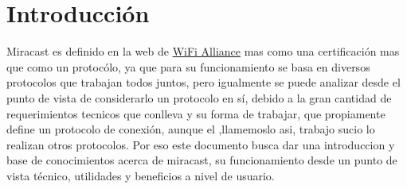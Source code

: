 \section{Introducción}

Miracast es definido en la web de \href{http://www.wi-fi.org/discover-wi-fi/wi-fi-certified-miracast}{WiFi Alliance} mas como una certificación mas que como un protocólo, ya que para su funcionamiento se basa en diversos protocolos que trabajan todos juntos, pero igualmente se puede analizar desde el punto de vista de considerarlo un protocolo en sí, debido a la gran cantidad de requerimientos tecnicos que conlleva y su forma de trabajar, que propiamente define un protocolo de conexión, aunque el ,llamemoslo asi, trabajo sucio lo realizan otros protocolos. Por eso este documento busca dar una introduccion y base de conocimientos acerca de miracast, su funcionamiento desde un punto de vista técnico, utilidades y beneficios a nivel de usuario.

